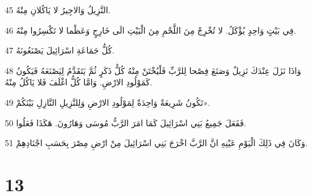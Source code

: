 \par 45 النَّزِيلُ وَالاجِيرُ لا يَاكُلانِ مِنْهُ.
\par 46 فِي بَيْتٍ وَاحِدٍ يُؤْكَلُ. لا تُخْرِجْ مِنَ اللَّحْمِ مِنَ الْبَيْتِ الَى خَارِجٍ وَعَظْما لا تَكْسِرُوا مِنْهُ.
\par 47 كُلُّ جَمَاعَةِ اسْرَائِيلَ يَصْنَعُونَهُ.
\par 48 وَاذَا نَزَلَ عِنْدَكَ نَزِيلٌ وَصَنَعَ فِصْحا لِلرَّبِّ فَلْيُخْتَنْ مِنْهُ كُلُّ ذَكَرٍ ثُمَّ يَتَقَدَّمُ لِيَصْنَعَهُ فَيَكُونُ كَمَوْلُودِ الارْضِ. وَامَّا كُلُّ اغْلَفَ فَلا يَاكُلُ مِنْهُ.
\par 49 تَكُونُ شَرِيعَةٌ وَاحِدَةٌ لِمَوْلُودِ الارْضِ وَلِلنَّزِيلِ النَّازِلِ بَيْنَكُمْ».
\par 50 فَفَعَلَ جَمِيعُ بَنِي اسْرَائِيلَ كَمَا امَرَ الرَّبُّ مُوسَى وَهَارُونَ. هَكَذَا فَعَلُوا.
\par 51 وَكَانَ فِي ذَلِكَ الْيَوْمِ عَيْنِهِ انَّ الرَّبَّ اخْرَجَ بَنِي اسْرَائِيلَ مِنْ ارْضِ مِصْرَ بِحَسَبِ اجْنَادِهِمْ.

\chapter{13}

